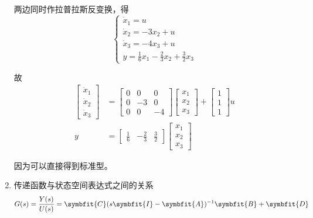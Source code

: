 \begin{enumerate}
    两边同时作拉普拉斯反变换，得
    \begin{equation*}
        \begin{cases}
            \dot{x}_1 = u \\
            \dot{x}_2 = -3x_2 + u \\
            \dot{x}_3 = -4x_3 + u \\
            y = \frac{1}{6}x_1 - \frac{2}{3}x_2 + \frac{3}{2}x_3
        \end{cases}
    \end{equation*}

    故
    \begin{align*}
        \begin{bmatrix}
            \dot{x}_1 \\
            \dot{x}_2 \\
            \dot{x}_3
        \end{bmatrix} &= \begin{bmatrix}
            0 & 0 & 0 \\
            0 & -3 & 0 \\
            0 & 0 & -4
        \end{bmatrix} \begin{bmatrix}
            x_1 \\
            x_2 \\
            x_3
        \end{bmatrix} + \begin{bmatrix}
            1 \\
            1 \\
            1
        \end{bmatrix} u \\
        y &= \begin{bmatrix}
            \frac{1}{6} & -\frac{2}{3} & \frac{3}{2}
        \end{bmatrix} \begin{bmatrix}
            x_1 \\
            x_2 \\
            x_3
        \end{bmatrix}
    \end{align*}

    因为可以直接得到标准型。
    \item 传递函数与状态空间表达式之间的关系
    \begin{equation}
        G(s) = \frac{Y(s)}{U(s)} = \symbfit{C}(s\symbfit{I} - \symbfit{A})^{-1} \symbfit{B} + \symbfit{D} \label{G}
    \end{equation}
\end{enumerate}

